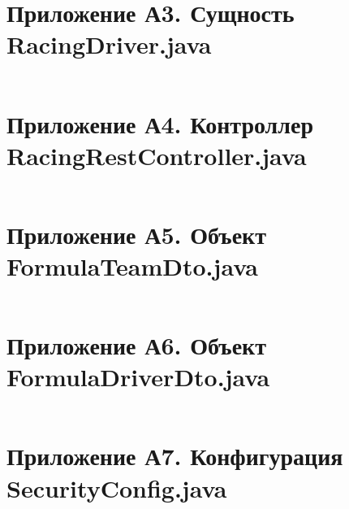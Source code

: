 \documentclass[oneside,a4paper,14pt]{extarticle}
\begin{document}
\section*{Приложение А3. Сущность RacingDriver.java}
\inputminted{java}{code/src/main/java/com/vyatsu/racing/models/RacingDriver.java}

\section*{Приложение А4. Контроллер RacingRestController.java}
\inputminted{java}{code/src/main/java/com/vyatsu/racing/controllers/RacingRestController.java}

\section*{Приложение А5. Объект FormulaTeamDto.java}
\inputminted{java}{code/src/main/java/com/vyatsu/racing/models/FormulaTeamDto.java}

\section*{Приложение А6. Объект FormulaDriverDto.java}
\inputminted{java}{code/src/main/java/com/vyatsu/racing/models/FormulaDriverDto.java}

\section*{Приложение А7. Конфигурация SecurityConfig.java}
\inputminted{java}{code/src/main/java/com/vyatsu/racing/config/SecurityConfig.java}
\end{document}
